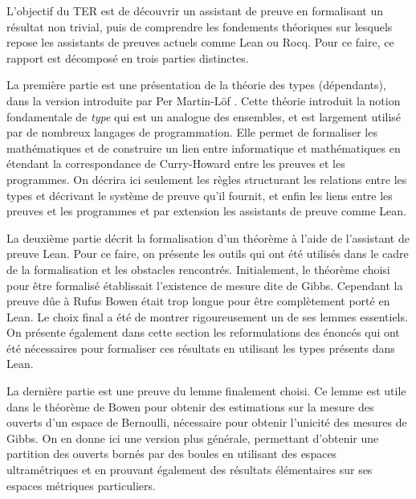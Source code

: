 \documentclass[../rapport.tex]{subfiles}
\begin{document}
  L'objectif du TER est de découvrir un assistant de preuve en formalisant un résultat non trivial,
  puis de comprendre les fondements théoriques sur lesquels repose les assistants de preuves actuels comme Lean ou Rocq.
  Pour ce faire, ce rapport est décomposé en trois parties distinctes.
  \vspace{0em}

  La première partie est une présentation de la théorie des types (dépendants),
  dans la version introduite par Per Martin-Löf \cite{martin2021intuitionistic}.
  Cette théorie introduit la notion fondamentale de \textit{type} qui est un analogue des ensembles,
  et est largement utilisé par de nombreux langages de programmation.
  Elle permet de formaliser les mathématiques et de construire un lien entre informatique et mathématiques en étendant
  la correspondance de Curry-Howard entre les preuves et les programmes.
  On décrira ici seulement les règles structurant les relations entre les types et décrivant le système de preuve qu'il fournit,
  et enfin les liens entre les preuves et les programmes et par extension les assistants de preuve comme Lean.
  \vspace{1em}

  La deuxième partie décrit la formalisation d'un théorème à l'aide de l'assistant de preuve Lean.
  Pour ce faire, on présente les outils qui ont été utilisés dans le cadre de la formalisation et les obstacles rencontrés.
  Initialement, le théorème choisi pour être formalisé établissait l'existence de mesure dite de Gibbs.
  Cependant la preuve dûe à Rufus Bowen \cite{bowen} était trop longue pour être complètement porté en Lean.
  Le choix final a été de montrer rigoureusement un de ses lemmes essentiels.
  On présente également dans cette section les reformulations des énoncés qui ont été nécessaires pour formaliser
  ces résultats en utilisant les types présents dans Lean.
  \vspace{1em}

  La dernière partie est une preuve du lemme finalement choisi.
  Ce lemme est utile dans le théorème de Bowen pour obtenir des estimations sur la mesure des ouverts d'un espace de Bernoulli,
  nécessaire pour obtenir l'unicité des mesures de Gibbs.
  On en donne ici une version plus générale,
  permettant d'obtenir une partition des ouverts bornés par des boules en utilisant des espaces ultramétriques
  et en prouvant également des résultats élémentaires sur ses espaces métriques particuliers.
\end{document}
